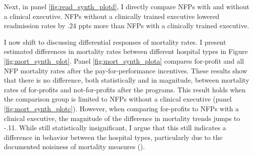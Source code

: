 \documentclass[12pt]{article}
\begin{document}

    Next, in panel \ref{fig:read_synth_plotd}, I directly compare NFPs with and without a clinical executive. NFPs without a clinically trained executive lowered readmission rates by .24 ppts more than NFPs with a clinically trained executive. 

    I now shift to discussing differential responses of mortality rates. I present estimated differences in mortality rates between different hospital types in Figure \ref{fig:mort_synth_plot}. Panel \ref{fig:mort_synth_plota} compares for-profit and all NFP mortality rates after the pay-for-performance incentives. These results show that there is no difference, both statistically and in magnitude, between mortality rates of for-profits and not-for-profits after the programs. This result holds when the comparison group is limited to NFPs without a clinical executive (panel \ref{fig:mort_synth_plotc}). However, when comparing for-profits to NFPs with a clinical executive, the magnitude of the difference in mortality trends jumps to -.11. While still statistically insignificant, I argue that this still indicates a difference in behavior between the hospital types, particularly due to the documented noisiness of mortality measures (\cite{mackenzie2016measuring}). 
\end{document}
